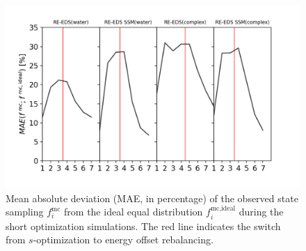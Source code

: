 \begin{figure}[H]
\centering
\includegraphics[width=\linewidth]{fig/results/ringOpening/paramOptimization/RingOpening_optimization_fractOptSampMAE.png}
\caption{Mean absolute deviation (MAE, in percentage) of the observed state sampling $f_i^{\text{mc}}$ from the ideal equal distribution $f_i^{\text{mc,ideal}}$ during the short optimization simulations. The red line indicates the switch from $s$-optimization to energy offset rebalancing.}
\label{SIfig:CHK1_RingOpening_optimization_fractOptSampMAE}
\end{figure}


